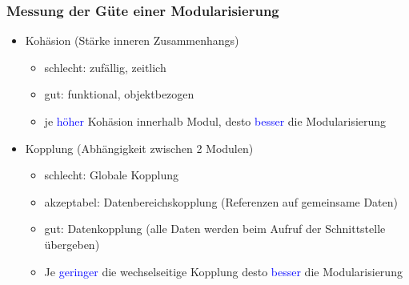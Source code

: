 \documentclass{article}
\begin{document}

\subsubsection{Messung der Güte einer Modularisierung}
\begin{itemize}
	\item Kohäsion (Stärke inneren Zusammenhangs)
	\begin{itemize}
		\item \colorbox{yellow!30}{schlecht:} zufällig, zeitlich
		\item \colorbox{yellow!30}{gut:} funktional, objektbezogen
		\item je \textcolor {blue}{höher} Kohäsion innerhalb Modul, desto \textcolor {blue} {besser} die Modularisierung
	\end{itemize}
	\item Kopplung (Abhängigkeit zwischen 2 Modulen)
	\begin{itemize}
		\item \colorbox{yellow!30}{schlecht:} Globale Kopplung
		\item \colorbox{yellow!30}{akzeptabel:} Datenbereichskopplung (Referenzen auf gemeinsame Daten)
		\item \colorbox{yellow!30}{gut:} Datenkopplung (alle Daten werden beim Aufruf der Schnittstelle übergeben)
		\item Je \textcolor {blue}{geringer} die wechselseitige Kopplung desto \textcolor {blue}{besser} die Modularisierung
	\end{itemize}
\end{itemize}
\end{document}
